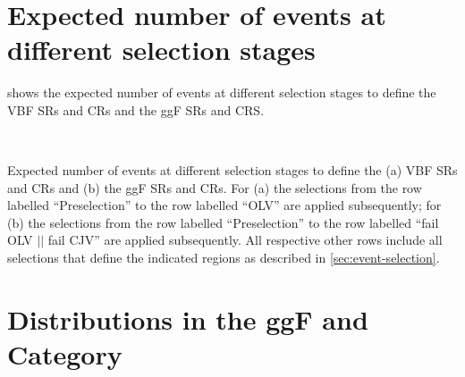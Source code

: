     \FloatBarrier
    \section{Expected number of events at different selection stages}
    \label{app:cutflows}

     shows the expected number of events at different selection stages to define the VBF \TwoJet SRs and CRs and the ggF \TwoJet SRs and CRS.

    \begin{landscape}
        \thispagestyle{empty}
        \begin{table}
            \subfloat[]{
                \resizebox{\textwidth}{!}{
                    
                }
            } \\
            \vspace{20pt}
            \subfloat[]{
                \resizebox{\textwidth}{!}{
                    
                }
            }
            \caption[Expected number of events at different selection stages.]{Expected number of events at different selection stages to define the (a) VBF \TwoJet SRs and CRs and (b) the ggF \TwoJet SRs and CRs. For (a) the selections from the row labelled ``Preselection'' to the row labelled ``OLV'' are applied subsequently; for (b) the selections from the row labelled ``Preselection'' to the row labelled ``fail OLV $||$ fail CJV'' are applied subsequently. All respective other rows include all selections that define the indicated regions as described in \cref{sec:event-selection}.}
            \label{app:tab:cutflows}
        \end{table}
    \end{landscape}



    \clearpage
    \FloatBarrier
    \section{Distributions in the ggF \ZeroJet and \OneJet Category}
    \label{app:event-selection-ggf}

